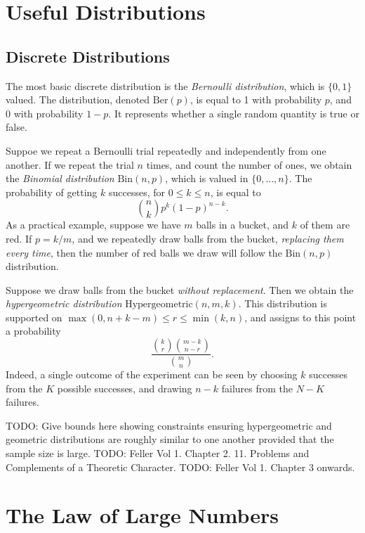 \chapter{Useful Distributions}

\section{Discrete Distributions}

The most basic discrete distribution is the \emph{Bernoulli distribution}, which is $\{ 0, 1 \}$ valued. The distribution, denoted $\text{Ber}(p)$, is equal to 1 with probability $p$, and 0 with probability $1 - p$. It represents whether a single random quantity is true or false.

Suppoe we repeat a Bernoulli trial repeatedly and independently from one another. If we repeat the trial $n$ times, and count the number of ones, we obtain the \emph{Binomial distribution} $\text{Bin}(n,p)$, which is valued in $\{ 0, \dots, n \}$. The probability of getting $k$ successes, for $0 \leq k \leq n$, is equal to
%
\[ {n \choose k} p^k (1 - p)^{n-k}. \]
%
As a practical example, suppose we have $m$ balls in a bucket, and $k$ of them are red. If $p = k/m$, and we repeatedly draw balls from the bucket, \emph{replacing them every time}, then the number of red balls we draw will follow the $\text{Bin}(n,p)$ distribution.

Suppose we draw balls from the bucket \emph{without replacement}. Then we obtain the \emph{hypergeometric distribution} $\text{Hypergeometric}(n,m,k)$. This distribution is supported on $\max(0,n+k-m) \leq r \leq \min(k,n)$, and assigns to this point a probability
%
\[ \frac{{k \choose r} {m-k \choose n-r}}{{m \choose n}}. \]
%
Indeed, a single outcome of the experiment can be seen by choosing $k$ successes from the $K$ possible successes, and drawing $n-k$ failures from the $N-K$ failures.

TODO: Give bounds here showing constraints ensuring hypergeometric and geometric distributions are roughly similar to one another provided that the sample size is large.
TODO: Feller Vol 1. Chapter 2. 11. Problems and Complements of a Theoretic Character.
TODO: Feller Vol 1. Chapter 3 onwards.





\chapter{The Law of Large Numbers}










